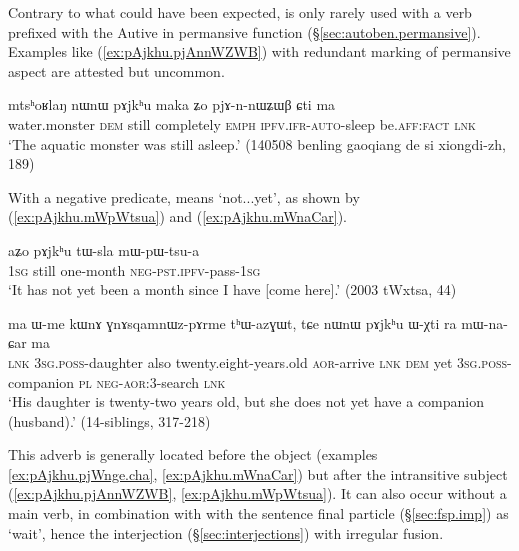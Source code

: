  Contrary to what could have been expected,  is only rarely used with a verb prefixed with the Autive in permansive function (§\ref{sec:autoben.permansive}). Examples like (\ref{ex:pAjkhu.pjAnnWZWB}) with redundant marking of permansive aspect are attested but uncommon.
 
\begin{exe}
\ex \label{ex:pAjkhu.pjAnnWZWB}
\gll mtsʰoʁlaŋ nɯnɯ pɤjkʰu maka ʑo pjɤ-n-nɯʑɯβ ɕti ma \\
water.monster \textsc{dem} still completely \textsc{emph} \textsc{ipfv}.\textsc{ifr}-\textsc{auto}-sleep be.\textsc{aff}:\textsc{fact} \textsc{lnk} \\
\glt `The aquatic monster was still  asleep.' (140508 benling gaoqiang de si xiongdi-zh, 189)
  \end{exe}
 
 With a negative predicate,  means `not...yet', as shown by (\ref{ex:pAjkhu.mWpWtsua}) and (\ref{ex:pAjkhu.mWnaCar}).
 
\begin{exe}
\ex \label{ex:pAjkhu.mWpWtsua}
\gll aʑo pɤjkʰu tɯ-sla mɯ-pɯ-tsu-a \\
 \textsc{1sg} still one-month \textsc{neg}-\textsc{pst}.\textsc{ipfv}-pass-\textsc{1sg} \\
 \glt `It has not yet been a month since I have [come here].' (2003 tWxtsa, 44)
\end{exe}

\begin{exe}
\ex \label{ex:pAjkhu.mWnaCar}
\gll ma ɯ-me kɯnɤ ɣnɤsqamnɯz-pɤrme tʰɯ-azɣɯt, tɕe nɯnɯ pɤjkʰu ɯ-χti ra mɯ-na-ɕar ma \\
\textsc{lnk} \textsc{3sg}.\textsc{poss}-daughter also twenty.eight-years.old \textsc{aor}-arrive \textsc{lnk} \textsc{dem} yet \textsc{3sg}.\textsc{poss}-companion \textsc{pl} \textsc{neg}-\textsc{aor}:3\flobv{}-search \textsc{lnk} \\
\glt `His daughter is twenty-two years old, but she does not yet have a companion (husband).' (14-siblings, 317-218)
\end{exe}

This adverb is generally located before the object (examples \ref{ex:pAjkhu.pjWnge.cha}, \ref{ex:pAjkhu.mWnaCar}) but after the intransitive subject (\ref{ex:pAjkhu.pjAnnWZWB}, \ref{ex:pAjkhu.mWpWtsua}).  It can also occur without a main verb, in combination with with the sentence final particle  (§\ref{sec:fsp.imp}) as  `wait', hence the interjection  (§\ref{sec:interjections}) with irregular fusion.
  
